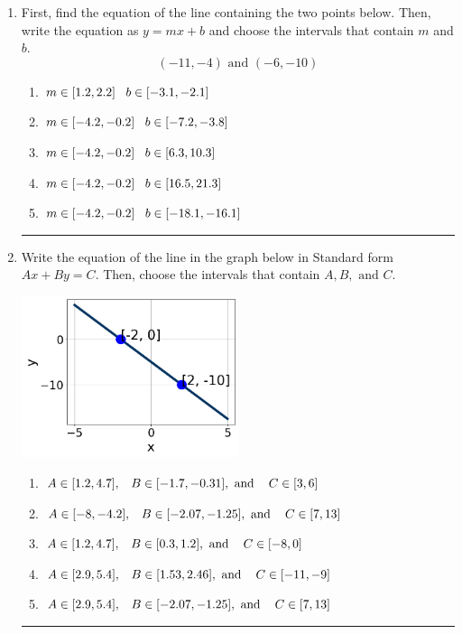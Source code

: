 \documentclass[14pt]{extbook}
\newcommand{\litem}[1]{\item#1\hspace*{-1cm}\rule{\textwidth}{0.4pt}}
\begin{document}
\begin{enumerate}
{\begin{enumerate}[label=\Alph*.]
\end{enumerate} }
\litem{
First, find the equation of the line containing the two points below. Then, write the equation as $ y=mx+b $ and choose the intervals that contain $m$ and $b$.\[ (-11, -4) \text{ and } (-6, -10) \]\begin{enumerate}[label=\Alph*.]
\item \( m \in [1.2, 2.2] \hspace*{3mm} b \in [-3.1, -2.1] \)
\item \( m \in [-4.2, -0.2] \hspace*{3mm} b \in [-7.2, -3.8] \)
\item \( m \in [-4.2, -0.2] \hspace*{3mm} b \in [6.3, 10.3] \)
\item \( m \in [-4.2, -0.2] \hspace*{3mm} b \in [16.5, 21.3] \)
\item \( m \in [-4.2, -0.2] \hspace*{3mm} b \in [-18.1, -16.1] \)

\end{enumerate} }
\litem{
Write the equation of the line in the graph below in Standard form $Ax+By=C$. Then, choose the intervals that contain $A, B, \text{ and } C$.
\begin{center}
    \includegraphics[width=0.5\textwidth]{../Figures/linearGraphToStandardCopyC.png}
\end{center}
\begin{enumerate}[label=\Alph*.]
\item \( A \in [1.2, 4.7], \hspace{3mm} B \in [-1.7, -0.31], \text{ and } \hspace{3mm} C \in [3, 6] \)
\item \( A \in [-8, -4.2], \hspace{3mm} B \in [-2.07, -1.25], \text{ and } \hspace{3mm} C \in [7, 13] \)
\item \( A \in [1.2, 4.7], \hspace{3mm} B \in [0.3, 1.2], \text{ and } \hspace{3mm} C \in [-8, 0] \)
\item \( A \in [2.9, 5.4], \hspace{3mm} B \in [1.53, 2.46], \text{ and } \hspace{3mm} C \in [-11, -9] \)
\item \( A \in [2.9, 5.4], \hspace{3mm} B \in [-2.07, -1.25], \text{ and } \hspace{3mm} C \in [7, 13] \)


\end{enumerate}}
\end{enumerate}
\end{document}
